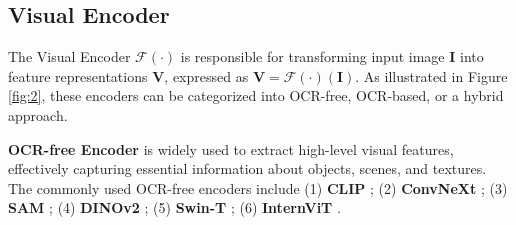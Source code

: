 \subsection{Visual Encoder}
\label{section_visual_encoder}
The Visual Encoder $\mathcal{F}(\cdot)$ is responsible for transforming input image $\mathbf{I}$ into feature representations $\mathbf{V}$, expressed as $\mathbf{V} = \mathcal{F}(\cdot)(\mathbf{I})$. As illustrated in Figure \ref{fig:2}, these encoders can be categorized into OCR-free, OCR-based, or a hybrid approach.



\noindent \textbf{OCR-free Encoder} is widely used to extract high-level visual features, effectively capturing essential information about objects, scenes, and textures. The commonly used OCR-free encoders include (1) \textbf{CLIP} \cite{radford2021CLIP}; (2) \textbf{ConvNeXt} \cite{woo2023convnext}; (3) \textbf{SAM} \cite{kirillov2023SAM}; (4) \textbf{DINOv2} \cite{oquab2023dinov2}; (5) \textbf{Swin-T} \cite{liu2021swin}; (6) \textbf{InternViT} \cite{chen2024internvlscalingvisionfoundation}.






